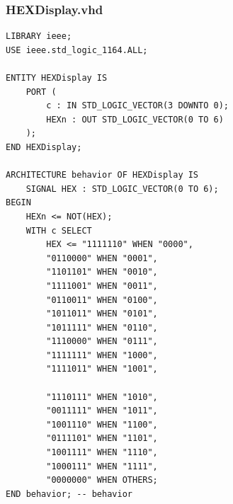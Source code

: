 \documentclass[13pt,a4paper]{report}
\begin{document}
\subsubsection{HEXDisplay.vhd}
\begin{verbatim}
LIBRARY ieee;
USE ieee.std_logic_1164.ALL;

ENTITY HEXDisplay IS
	PORT (
		c : IN STD_LOGIC_VECTOR(3 DOWNTO 0);
		HEXn : OUT STD_LOGIC_VECTOR(0 TO 6)
	);
END HEXDisplay;

ARCHITECTURE behavior OF HEXDisplay IS
	SIGNAL HEX : STD_LOGIC_VECTOR(0 TO 6);
BEGIN
	HEXn <= NOT(HEX);
	WITH c SELECT
		HEX <= "1111110" WHEN "0000",
		"0110000" WHEN "0001",
		"1101101" WHEN "0010",
		"1111001" WHEN "0011",
		"0110011" WHEN "0100",
		"1011011" WHEN "0101",
		"1011111" WHEN "0110",
		"1110000" WHEN "0111",
		"1111111" WHEN "1000",
		"1111011" WHEN "1001",

		"1110111" WHEN "1010",
		"0011111" WHEN "1011",
		"1001110" WHEN "1100",
		"0111101" WHEN "1101",
		"1001111" WHEN "1110",
		"1000111" WHEN "1111",
		"0000000" WHEN OTHERS;
END behavior; -- behavior
\end{verbatim}
\end{document}
